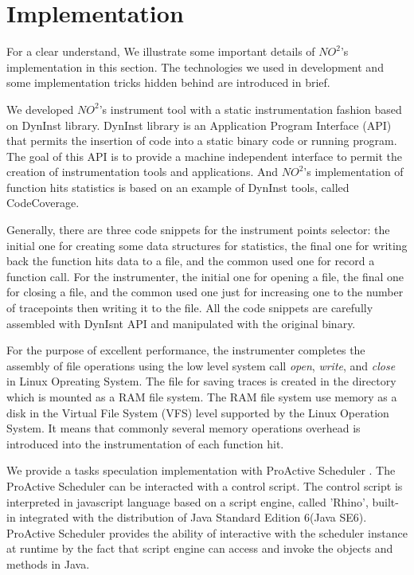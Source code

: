 \section{Implementation}

For a clear understand, We illustrate some important details of $NO^2$'s implementation in this section. The technologies we used in development and some implementation tricks hidden behind are introduced in brief.

We developed $NO^2$'s instrument tool with a static instrumentation fashion based on DynInst \cite{Dyninst-Deconstruction} library. DynInst library is an Application Program Interface (API) \cite{dyninstapi} that permits the insertion of code into a static binary code or running program. The goal of this API is to provide a machine independent interface to permit the creation of instrumentation tools and applications. And $NO^2$'s implementation of function hits statistics is based on an example of DynInst tools, called CodeCoverage.

Generally, there are three code snippets for the instrument points selector: the initial one for creating some data structures for statistics, the final one for writing back the function hits data to a file, and the common used one for record a function call. For the instrumenter, the initial one for opening a file, the final one for closing a file, and the common used one just for increasing one to the number of tracepoints then writing it to the file. All the code snippets are carefully assembled with DynIsnt API and manipulated with the original binary.

For the purpose of excellent performance, the instrumenter completes the assembly of file operations using the low level system call \emph{open}, \emph{write}, and \emph{close} in Linux Opreating System. The file for saving traces is created in the directory which is mounted as a RAM file system. The RAM file system use memory as a disk in the Virtual File System (VFS) level supported by the Linux Operation System. It means that commonly several memory operations overhead is introduced into the instrumentation of each function hit.

We provide a tasks speculation implementation with ProActive Scheduler \cite{pascheduling}. The ProActive Scheduler can be interacted with a control script. The control script is interpreted in javascript language based on a script engine, called 'Rhino', built-in integrated with the distribution of Java Standard Edition 6(Java SE6). ProActive Scheduler provides the ability of interactive with the scheduler instance at runtime by the fact that script engine can access and invoke the objects and methods in Java.

